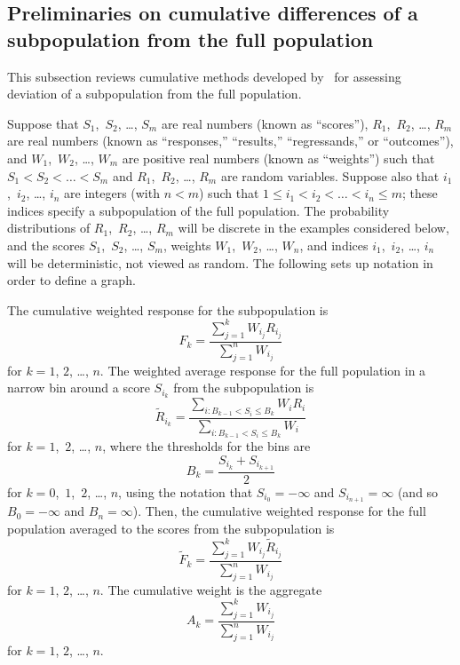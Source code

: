 \documentclass{article}
\begin{document}
\subsection{Preliminaries on cumulative differences of a subpopulation
from the full population}
\label{subpop}

This subsection reviews cumulative methods developed by~\cite{tygert_full}
for assessing deviation of a subpopulation from the full population.

Suppose that $S_1$,~$S_2$, \dots, $S_m$ are real numbers (known as ``scores''),
$R_1$,~$R_2$, \dots, $R_m$ are real numbers (known as ``responses,''
``results,'' ``regressands,'' or ``outcomes''),
and $W_1$,~$W_2$, \dots, $W_m$ are positive real numbers (known as ``weights'')
such that $S_1 < S_2 < \dots < S_m$ and $R_1$,~$R_2$, \dots, $R_m$
are random variables.
Suppose also that $i_1$,~$i_2$, \dots, $i_n$ are integers (with $n < m$)
such that $1 \le i_1 < i_2 < \dots < i_n \le m$; these indices specify
a subpopulation of the full population.
The probability distributions of $R_1$,~$R_2$, \dots, $R_m$ will be discrete
in the examples considered below, and the scores $S_1$,~$S_2$, \dots, $S_m$,
weights $W_1$,~$W_2$, \dots, $W_n$, and indices $i_1$,~$i_2$, \dots, $i_n$
will be deterministic, not viewed as random.
The following sets up notation in order to define a graph.

The cumulative weighted response for the subpopulation is
%
\begin{equation}
F_k = \frac{\sum_{j=1}^k W_{i_j} R_{i_j}}{\sum_{j=1}^n W_{i_j}}
\end{equation}
%
for $k = 1$, $2$, \dots, $n$.
The weighted average response for the full population in a narrow bin
around a score $S_{i_k}$ from the subpopulation is
%
\begin{equation}
\tilde{R}_{i_k} = \frac{\sum_{i : B_{k-1} < S_i \le B_k} W_i R_i}
                       {\sum_{i : B_{k-1} < S_i \le B_k} W_i}
\end{equation}
%
for $k = 1$,~$2$, \dots, $n$, where the thresholds for the bins are
%
\begin{equation}
B_k = \frac{S_{i_k} + S_{i_{k+1}}}{2}
\end{equation}
%
for $k = 0$,~$1$,~$2$, \dots, $n$, using the notation that
$S_{i_0} = -\infty$ and $S_{i_{n+1}} = \infty$
(and so $B_0 = -\infty$ and $B_n = \infty$).
Then, the cumulative weighted response for the full population
averaged to the scores from the subpopulation is
%
\begin{equation}
\tilde{F}_k = \frac{\sum_{j=1}^k W_{i_j} \tilde{R}_{i_j}}{\sum_{j=1}^n W_{i_j}}
\end{equation}
%
for $k = 1$, $2$, \dots, $n$.
The cumulative weight is the aggregate
%
\begin{equation}
A_k = \frac{\sum_{j=1}^k W_{i_j}}{\sum_{j=1}^n W_{i_j}}
\end{equation}
%
for $k = 1$, $2$, \dots, $n$.
\end{document}
